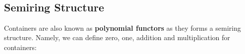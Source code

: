 \begin{code}%
\>[0]\AgdaSpace{}%
\AgdaSymbol{:}\AgdaSpace{}%
\AgdaSpace{}%
\AgdaSpace{}%
\AgdaSpace{}%
\AgdaSpace{}%
\AgdaSymbol{(}\AgdaSpace{}%
\AgdaSymbol{:}\AgdaSpace{}%
\AgdaSymbol{)}\AgdaSpace{}%
\AgdaSpace{}%
\AgdaSpace{}%
\AgdaSpace{}%
\AgdaSpace{}%
\AgdaSpace{}%
\AgdaSpace{}%
\AgdaSpace{}%
\AgdaSpace{}%
\AgdaSpace{}%
\<%
\\
\>[0]\AgdaSpace{}%
\AgdaSpace{}%
\AgdaSpace{}%
\AgdaSpace{}%
\AgdaSpace{}%
\AgdaSpace{}%
\AgdaSymbol{(}\AgdaSpace{}%
\AgdaOperator{\AgdaInductiveConstructor{,}}\AgdaSpace{}%
\AgdaSymbol{)}\AgdaSpace{}%
\AgdaSymbol{=}\AgdaSpace{}%
\AgdaSpace{}%
\AgdaSpace{}%
\AgdaOperator{\AgdaInductiveConstructor{,}}\AgdaSpace{}%
\AgdaSpace{}%
\AgdaSpace{}%
\AgdaSpace{}%
\<%
\end{code}

\subsection{Semiring Structure}

Containers are also known as \textbf{polynomial functors} as they forms a semiring structure. Namely, we can define zero, one, addition and multiplication for containers:


